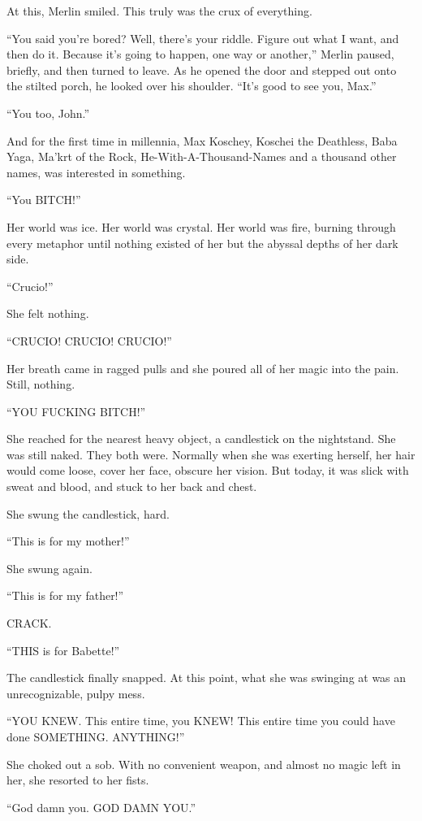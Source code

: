 At this, Merlin smiled. This truly was the crux of everything.

“You said you’re bored? Well, there’s your riddle. Figure out what I want, and then do it. Because it’s going to happen, one way or another,” Merlin paused, briefly, and then turned to leave. As he opened the door and stepped out onto the stilted porch, he looked over his shoulder. “It’s good to see you, Max.”

“You too, John.”

And for the first time in millennia, Max Koschey, Koschei the Deathless, Baba Yaga, Ma’krt of the Rock, He-With-A-Thousand-Names and a thousand other names, was interested in something.
\simpleline
{}

“You BITCH!”

Her world was ice. Her world was crystal. Her world was fire, burning through every metaphor until nothing existed of her but the abyssal depths of her dark side.

“Crucio!”

She felt nothing.

“CRUCIO! CRUCIO! CRUCIO!”

Her breath came in ragged pulls and she poured all of her magic into the pain. Still, nothing.

“YOU FUCKING BITCH!”

She reached for the nearest heavy object, a candlestick on the nightstand. She was still naked. They both were. Normally when she was exerting herself, her hair would come loose, cover her face, obscure her vision. But today, it was slick with sweat and blood, and stuck to her back and chest.

She swung the candlestick, hard.

“This is for my mother!”

She swung again.

“This is for my father!”

CRACK.

“THIS is for Babette!”

The candlestick finally snapped. At this point, what she was swinging at was an unrecognizable, pulpy mess.

“YOU KNEW. This entire time, you KNEW! This entire time you could have done SOMETHING. ANYTHING!”

She choked out a sob. With no convenient weapon, and almost no magic left in her, she resorted to her fists.

“God damn you. GOD DAMN YOU.”

